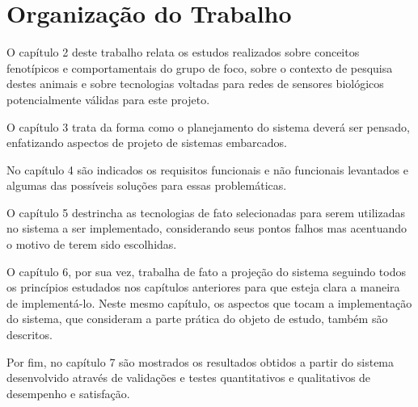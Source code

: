 \section{Organização do Trabalho}
O capítulo 2 deste trabalho relata os estudos realizados sobre conceitos fenotípicos e comportamentais do grupo de foco, sobre o contexto de pesquisa destes animais e sobre tecnologias voltadas para redes de sensores biológicos potencialmente válidas para este projeto.

O capítulo 3 trata da forma como o planejamento do sistema deverá ser pensado, enfatizando aspectos de projeto de sistemas embarcados. 

No capítulo 4 são indicados os requisitos funcionais e não funcionais levantados e algumas das possíveis soluções para essas problemáticas.

O capítulo 5 destrincha as tecnologias de fato selecionadas para serem utilizadas no sistema a ser implementado, considerando seus pontos falhos mas acentuando o motivo de terem sido escolhidas.

O capítulo 6, por sua vez, trabalha de fato a projeção do sistema seguindo todos os princípios estudados nos capítulos anteriores para que esteja clara a maneira de implementá-lo. Neste mesmo capítulo, os aspectos que tocam a implementação do sistema, que consideram a parte prática do objeto de estudo, também são descritos.

Por fim, no capítulo 7 são mostrados os resultados obtidos a partir do sistema desenvolvido através de validações e testes quantitativos e qualitativos de desempenho e satisfação.


